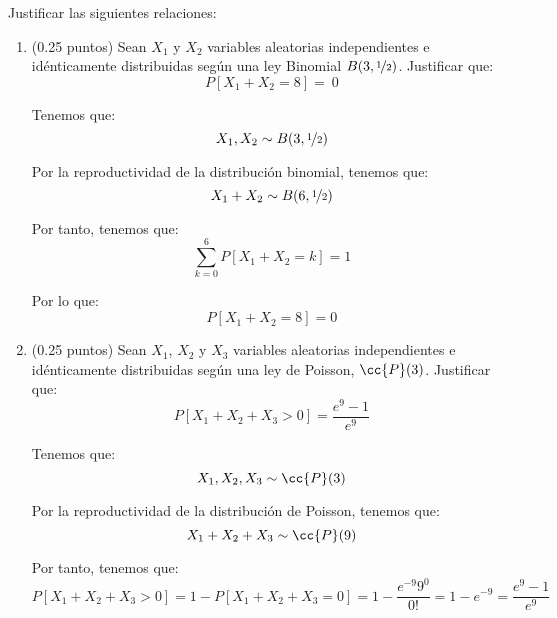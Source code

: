 \documentclass[12pt]{article}
\begin{document}
\begin{ejercicio}[1.5 puntos]
        Justificar las siguientes relaciones:
        \begin{enumerate}
            \item (0.25 puntos) Sean $X_1$ y $X_2$ variables aleatorias independientes e idénticamente distribuidas según una ley Binomial $B(3, \nicefrac{1}{2})$. Justificar que: $$P[X_1 + X_2 = 8] =~0$$
            
            Tenemos que:
            \begin{equation*}
                X_1, X_2 \sim B(3, \nicefrac{1}{2}) 
            \end{equation*}

            Por la reproductividad de la distribución binomial, tenemos que:
            \begin{equation*}
                X_1 + X_2 \sim B(6, \nicefrac{1}{2})
            \end{equation*}

            Por tanto, tenemos que:
            \begin{equation*}
                \sum_{k=0}^6 P[X_1 + X_2 = k] = 1
            \end{equation*}

            Por lo que:
            \begin{equation*}
                P[X_1 + X_2 = 8] = 0
            \end{equation*}
            \item (0.25 puntos) Sean $X_1$, $X_2$ y $X_3$ variables aleatorias independientes e idénticamente distribuidas según una ley de Poisson, $\cc{P}(3)$. Justificar que: $$P[X_1 + X_2 + X_3 > 0] = \frac{e^9 - 1}{e^9}$$
            
            Tenemos que:
            \begin{equation*}
                X_1, X_2, X_3 \sim \cc{P}(3)
            \end{equation*}

            Por la reproductividad de la distribución de Poisson, tenemos que:
            \begin{equation*}
                X_1 + X_2 + X_3 \sim \cc{P}(9)
            \end{equation*}

            Por tanto, tenemos que:
            \begin{equation*}
                P[X_1 + X_2 + X_3 > 0] = 1 - P[X_1 + X_2 + X_3 = 0] = 1 - \frac{e^{-9}9^0}{0!} = 1 - e^{-9} = \frac{e^9 - 1}{e^9}
            \end{equation*}


\end{enumerate}
\end{ejercicio}
\end{document}
